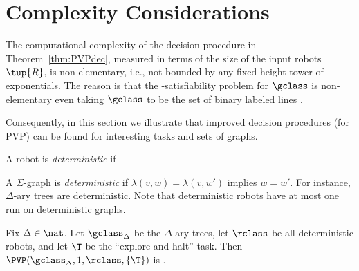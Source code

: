 

\section{Complexity Considerations}

The computational complexity of the decision procedure in Theorem~\ref{thm:PVPdec}, measured in terms of the size of the input robots $\tup{R}$, is non-elementary, i.e., not bounded by any fixed-height tower of exponentials. The reason is that the \msol-satisfiability problem for $\gclass$ is non-elementary even taking $\gclass$ to be the set of binary labeled lines \cite{Stock74}.

Consequently, in this section we illustrate that improved decision procedures (for PVP) can be found for interesting tasks and sets of graphs.





%
%
%

A robot is {\em deterministic} if 

A $\Sigma$-graph is {\em deterministic} if $\lambda(v,w) = \lambda(v,w')$ implies $w = w'$. For instance, $\Delta$-ary trees are deterministic. Note that deterministic robots have at most one run on deterministic graphs.

\begin{theorem}  \label{thm:exptime}
Fix $\Delta \in \nat$. Let $\gclass_\Delta$ be the $\Delta$-ary trees, let $\rclass$ be all deterministic robots, and let $\T$  be the ``explore and halt'' task.  Then $\PVP(\gclass_\Delta,1,\rclass,\{\T\})$ is \exptimeC.
\end{theorem}



